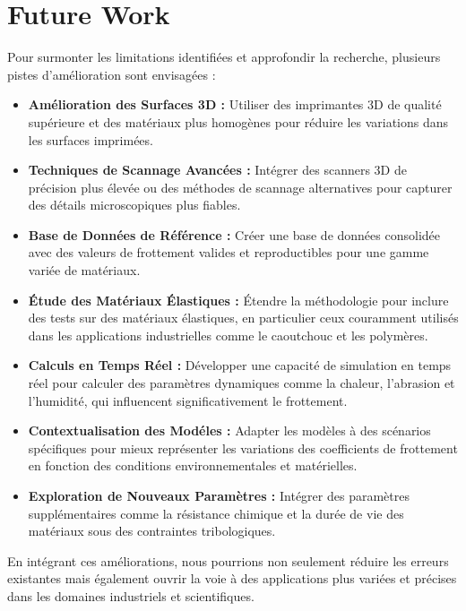 \section{Future Work}
Pour surmonter les limitations identifi\'ees et approfondir la recherche, plusieurs pistes d'am\'elioration sont envisag\'ees :
\begin{itemize}
    \item \textbf{Am\'elioration des Surfaces 3D :} Utiliser des imprimantes 3D de qualit\'e sup\'erieure et des mat\'eriaux plus homog\`enes pour r\'eduire les variations dans les surfaces imprim\'ees.
    \item \textbf{Techniques de Scannage Avanc\'ees :} Int\'egrer des scanners 3D de pr\'ecision plus \'{e}lev\'ee ou des m\'ethodes de scannage alternatives pour capturer des d\'etails microscopiques plus fiables.
    \item \textbf{Base de Donn\'ees de R\'ef\'erence :} Cr\'eer une base de donn\'ees consolid\'ee avec des valeurs de frottement valides et reproductibles pour une gamme vari\'ee de mat\'eriaux.
    \item \textbf{\'Etude des Mat\'eriaux \'Elastiques :} \'Etendre la m\'ethodologie pour inclure des tests sur des mat\'eriaux \'elastiques, en particulier ceux couramment utilis\'es dans les applications industrielles comme le caoutchouc et les polym\`eres.
    \item \textbf{Calculs en Temps R\'eel :} D\'evelopper une capacit\'e de simulation en temps r\'eel pour calculer des param\`etres dynamiques comme la chaleur, l'abrasion et l'humidit\'e, qui influencent significativement le frottement.
    \item \textbf{Contextualisation des Mod\'eles :} Adapter les mod\`eles \`a des sc\'enarios sp\'ecifiques pour mieux repr\'esenter les variations des coefficients de frottement en fonction des conditions environnementales et mat\'erielles.
    \item \textbf{Exploration de Nouveaux Param\`etres :} Int\'egrer des param\`etres suppl\'ementaires comme la r\'esistance chimique et la dur\'ee de vie des mat\'eriaux sous des contraintes tribologiques.
\end{itemize}

En int\'egrant ces am\'eliorations, nous pourrions non seulement r\'eduire les erreurs existantes mais \'{e}galement ouvrir la voie \`a des applications plus vari\'ees et pr\'ecises dans les domaines industriels et scientifiques.
